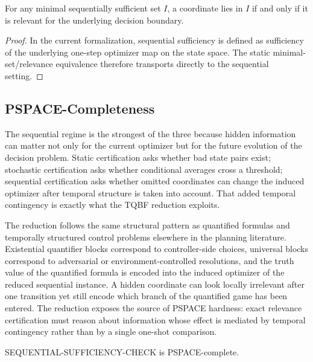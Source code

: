 \begin{proposition}\label{prop:sequential-minimal-relevant}
For any minimal sequentially sufficient set $I$, a coordinate lies in $I$ if and only if it is relevant for the underlying decision boundary.
\end{proposition}


\begin{proof}
In the current formalization, sequential sufficiency is defined as sufficiency of the underlying one-step optimizer map on the state space. The static minimal-set/relevance equivalence therefore transports directly to the sequential setting.
\end{proof}

\subsection{PSPACE-Completeness}

The sequential regime is the strongest of the three because hidden information can matter not only for the current optimizer but for the future evolution of the decision problem. Static certification asks whether bad state pairs exist; stochastic certification asks whether conditional averages cross a threshold; sequential certification asks whether omitted coordinates can change the induced optimizer after temporal structure is taken into account. That added temporal contingency is exactly what the TQBF reduction exploits.

The reduction follows the same structural pattern as quantified formulas and temporally structured control problems elsewhere in the planning literature. Existential quantifier blocks correspond to controller-side choices, universal blocks correspond to adversarial or environment-controlled resolutions, and the truth value of the quantified formula is encoded into the induced optimizer of the reduced sequential instance. A hidden coordinate can look locally irrelevant after one transition yet still encode which branch of the quantified game has been entered. The reduction exposes the source of PSPACE hardness: exact relevance certification must reason about information whose effect is mediated by temporal contingency rather than by a single one-shot comparison.

\begin{theorem}\label{thm:sequential-pspace}
SEQUENTIAL-SUFFICIENCY-CHECK is PSPACE-complete.
\end{theorem}

